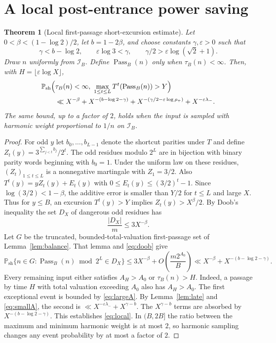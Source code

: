 \documentclass[11pt]{amsart}
\newtheorem{theorem}{Theorem}
\theoremstyle{remark}\newtheorem{remark}{Remark}
\newcommand{\Pass}{\operatorname{Pass}}
\newcommand{\Psh}{\mathbb P_{\mathrm{sh}}}
\begin{document}
\section{A local post-entrance power saving}
\begin{theorem}[Local first-passage short-excursion estimate]\label{thm:local}
Let $0<\beta< (1-\log2)/2$, let $b=1-2\beta$, and choose constants $\gamma,\varepsilon>0$ such that
\[
 \gamma<b-\log2,\qquad \varepsilon\log3<\gamma,
 \qquad \gamma/2>\varepsilon\log(\sqrt2+1).
\]
Draw $n$ uniformly from $\mathcal I_B$.  Define $\Pass_B(n)$ only when $\tau_B(n)<\infty$.  Then, with $H=\lfloor\varepsilon\log X\rfloor$,
\begin{align}
 &\Psh\Bigl(\tau_B(n)<\infty,\ 
       \max_{1\le t\le L}T^t(\Pass_B(n))>Y\Bigr)\label{eq:local}\nonumber\\
 &\qquad\ll X^{-\beta}+X^{-(b-\log2-\gamma)}
     +X^{-(\gamma/2-\varepsilon\log\rho_+)}
     +X^{-\varepsilon\lambda_-}.
\end{align}
The same bound, up to a factor of $2$, holds when the input is sampled with harmonic weight proportional to $1/n$ on $\mathcal I_B$.
\end{theorem}
\begin{proof}
For odd $y$ let $b_0,\ldots,b_{L-1}$ denote the shortcut parities under $T$ and define $Z_t(y)=3^{\sum_{j<t}b_j}/2^t$.  The odd residues modulo $2^L$ are in bijection with binary parity words beginning with $b_0=1$.  Under the uniform law on these residues, $(Z_t)_{1\le t\le L}$ is a nonnegative martingale with $Z_1=3/2$.  Also $T^t(y)=yZ_t(y)+E_t(y)$ with $0\le E_t(y)\le(3/2)^t-1$.  Since $\log(3/2)<1-\beta$, the additive error is smaller than $Y/2$ for $t\le L$ and large $X$. Thus for $y\le B$, an excursion $T^t(y)>Y$ implies $Z_t(y)>X^\beta/2$.  By Doob's inequality the set $D_X$ of dangerous odd residues has
\begin{equation}\label{eq:doob}
 \frac{|D_X|}{m}\le3X^{-\beta}.
\end{equation}
Let $G$ be the truncated, bounded-total-valuation first-passage set of Lemma~\ref{lem:balance}.  That lemma and \eqref{eq:doob} give
\[
 \Psh\{n\in G:\Pass_B(n)\bmod2^L\in D_X\}
 \le3X^{-\beta}+O\left(\frac{m2^{A_0}}B\right)
 \ll X^{-\beta}+X^{-(b-\log2-\gamma)}.
\]
Every remaining input either satisfies $A_H>A_0$ or $\tau_B(n)>H$.  Indeed, a passage by time $H$ with total valuation exceeding $A_0$ also has $A_H>A_0$.  The first exceptional event is bounded by \eqref{eq:largeA}.  By Lemma~\ref{lem:late} and \eqref{eq:smallA}, the second is $\ll X^{-\varepsilon\lambda_-}+X^{\gamma-b}$.  The $X^{\gamma-b}$ terms are absorbed by $X^{-(b-\log2-\gamma)}$.  This establishes \eqref{eq:local}.  In $(B,2B]$ the ratio between the maximum and minimum harmonic weight is at most $2$, so harmonic sampling changes any event probability by at most a factor of $2$.
\end{proof}
\end{document}
